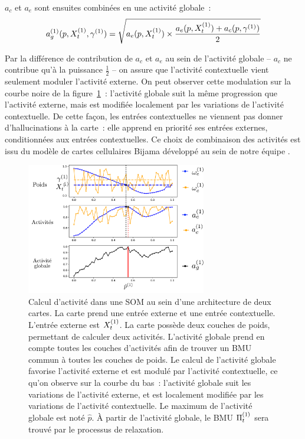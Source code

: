 \documentclass[../main]{subfiles}
\begin{document}
$a_c$ et $a_e$ sont ensuites combinées en une activité globale~:
\begin{equation}
a_g^{({1})}(p, X^{({1})}_t,\gamma^{({1})}) = \sqrt{a_e(p, X^{({1})}_t)\times \frac{a_e(p, X^{({1})}_t) + a_c(p,\gamma^{({1})})}{2}}
\end{equation}

Par la différence de contribution de $a_c$ et $a_e$ au sein de l'activité globale -- $a_c$ ne contribue qu'à la puissance $\frac{1}{2}$ -- on assure que l'activité contextuelle vient seulement moduler l'activité externe.
On peut observer cette modulation sur la courbe noire de la figure~\ref{fig:2som_activite}~: l'activité globale suit la même progression que l'activité externe, mais est modifiée localement par les variations de l'activité contextuelle. 
De cette façon, les entrées contextuelles ne viennent pas donner d'\og hallucinations \fg{} à la carte~: elle apprend en priorité ses entrées externes, conditionnées aux entrées contextuelles. Ce choix de combinaison des activités est issu du modèle de cartes cellulaires Bijama développé au sein de notre équipe \parencite{menard05,khouzam_2013,baheux_towards_2014}.

\begin{figure}
    \centering
    \includegraphics[width=0.7\textwidth]{activite_layers_2maps.pdf}
    \caption{Calcul d'activité dans une SOM au sein d'une architecture de deux cartes. La carte prend une entrée externe et une entrée contextuelle. 
    L'entrée externe est $X^{({1})}_t$. La carte possède deux couches de poids, permettant de calculer deux activités. L'activité globale prend en compte toutes les couches d'activités afin de trouver un BMU commun à toutes les couches de poids. Le calcul de l'activité globale favorise l'activité externe et est modulé par l'activité contextuelle, ce qu'on observe sur la courbe du bas~: l'activité globale suit les variations de l'activité externe, et est localement modifiée par les variations de l'activité contextuelle.
    Le maximum de l'activité globale est noté $\hat{p}$. \`A partir de l'activité globale, le BMU $\Pi^{({1})}_t$ sera trouvé par le processus de relaxation. \label{fig:2som_activite}}
    \end{figure}
\end{document}
